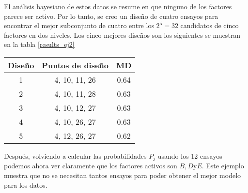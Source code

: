 El análisis bayesiano de estos datos se resume en que ninguno de los factores parece ser activo. Por lo tanto, se creo un diseño de cuatro ensayos para encontrar el mejor subconjunto de cuatro entre los $2^{5} = 32$ candidatos de cinco factores en dos niveles. Los cinco mejores diseños son los siguientes se muestran en la tabla \ref{results_ej2}

\begin{center}
	\begin{tabular}{cc|c}
		Diseño & Puntos de diseño & MD \\
		\hline
		1 & 4, 10, 11, 26 & 0.64 \\
		
		2 & 4, 10, 11, 28 & 0.63 \\
		
		3 & 4, 10, 12, 27 & 0.63 \\
		
		4 & 4, 10, 26, 27 & 0.63 \\
		
		5 & 4, 12, 26, 27 & 0.62 \\
		
	\end{tabular}
	 \label{results_ej2}
\end{center}


Después, volviendo a calcular las probabilidades $P_j$ usando los 12 ensayos podemos ahora ver claramente que los factores activos son $B, D \text{y} E$. Este ejemplo muestra que no se necesitan tantos ensayos para poder obtener el mejor modelo para los datos. 







 


